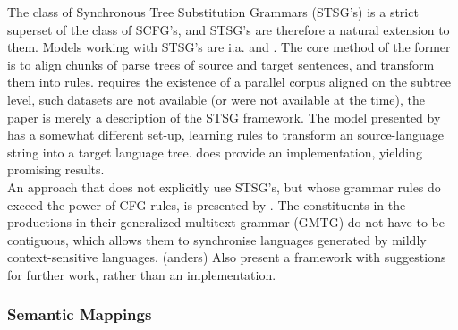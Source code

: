 \documentclass{report}
\theoremstyle{definition}
\theoremstyle{plain}
\begin{document}
The class of Synchronous Tree Substitution Grammars (STSG's) is a strict superset of the class of SCFG's, and STSG's are therefore a natural extension to them. Models working with STSG's are i.a. \cite{poutsma2000data} and \cite{galley2004s,galley2006scalable}. The core method of the former is to align chunks of parse trees of source and target sentences, and transform them into rules. \cite{poutsma2000data} requires the existence of a parallel corpus aligned on the subtree level, such datasets are not available (or were not available at the time), the paper is merely a description of the STSG framework.  The model presented by \citeauthor{galley2004s} has a somewhat different set-up, learning rules to transform an source-language string into a target language tree. \cite{galley2006scalable} does provide an implementation, yielding promising results.\\
An approach that does not explicitly use STSG's, but whose grammar rules do exceed the power of CFG rules, is presented by \cite{melamed2004generalized}. The constituents in the productions in their generalized multitext grammar (GMTG) do not have to be contiguous, which allows them to synchronise languages generated by mildly context-sensitive languages. (anders) Also \citeauthor{melamed2004generalized} present a framework with suggestions for further work, rather than an implementation.


\subsubsection{Semantic Mappings}
\end{document}
